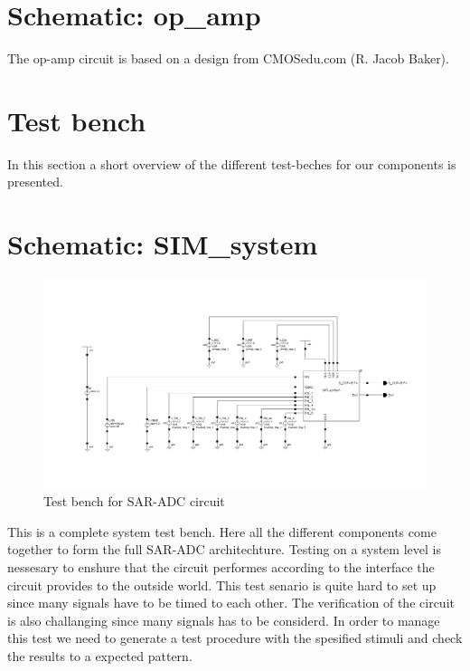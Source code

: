 \documentclass[english, a4paper,11pt]{article}
\begin{document}
\section*{Schematic: op\_amp}
The op-amp circuit is based on a design from CMOSedu.com (R. Jacob Baker). 

\section{Test bench}
In this section a short overview of the different test-beches for our components is presented.


\section*{Schematic: SIM\_system}
\begin{figure}[!ht]
 \centering
   \includegraphics[width=\textwidth]{img/SIM_system.png}
   \caption{Test bench for SAR-ADC circuit}
   \label{sim:system}
\end{figure}
This is a complete system test bench. Here all the different components come together to form the full SAR-ADC architechture. 
Testing on a system level is nessesary to enshure that the circuit performes according to the interface the circuit provides to the outside world.
This test senario is quite hard to set up since many signals have to be timed to each other. The verification of the circuit is also challanging since many signals has to be considerd.
In order to manage this test we need to generate a test procedure with the spesified stimuli and check the results to a expected pattern.
\end{document}
